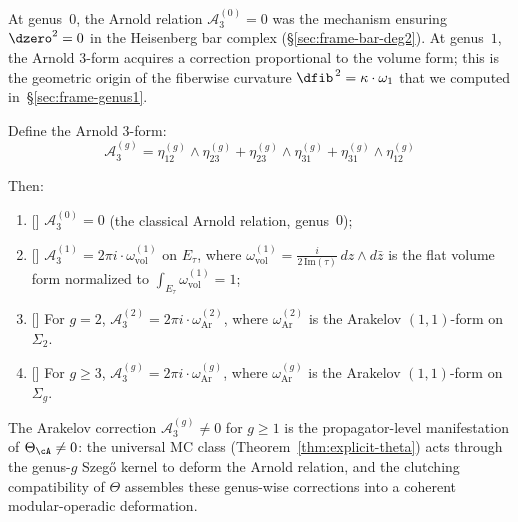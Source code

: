 \begin{theorem}
\label{thm:quantum-arnold-relations}
\label{thm:arnold-higher-genus}
\label{thm:arnold-quantum}
At genus~$0$, the Arnold relation $\mathcal{A}_3^{(0)} = 0$ was the mechanism ensuring $\dzero^2 = 0$ in the Heisenberg bar complex (\S\ref{sec:frame-bar-deg2}).  At genus~$1$, the Arnold $3$-form acquires a correction proportional to the volume form; this is the geometric origin of the fiberwise curvature $\dfib^{\,2} = \kappa \cdot \omega_1$ that we computed in~\S\ref{sec:frame-genus1}.

Define the Arnold 3-form:
\begin{equation}
\mathcal{A}_3^{(g)} = \eta_{12}^{(g)} \wedge \eta_{23}^{(g)} + \eta_{23}^{(g)} \wedge \eta_{31}^{(g)} + \eta_{31}^{(g)} \wedge \eta_{12}^{(g)}
\end{equation}

Then:
\begin{enumerate}
\item[\textup{(a)}] \textup{[\ClaimStatusProvedHere]} $\mathcal{A}_3^{(0)} = 0$ \textup{(}the classical Arnold relation, genus~$0$\textup{);}

\item[\textup{(b)}] \textup{[\ClaimStatusProvedHere]} $\mathcal{A}_3^{(1)} = 2\pi i \cdot \omega_{\mathrm{vol}}^{(1)}$ on $E_\tau$, where $\omega_{\mathrm{vol}}^{(1)} = \frac{i}{2\,\mathrm{Im}(\tau)}\, dz \wedge d\bar{z}$ is the flat volume form normalized to $\int_{E_\tau} \omega_{\mathrm{vol}}^{(1)} = 1$;

\item[\textup{(c)}] \textup{[\ClaimStatusProvedHere]} For $g = 2$, $\mathcal{A}_3^{(2)} = 2\pi i \cdot \omega_{\mathrm{Ar}}^{(2)}$, where $\omega_{\mathrm{Ar}}^{(2)}$ is the Arakelov $(1,1)$-form on $\Sigma_2$.

\item[\textup{(d)}] \textup{[\ClaimStatusProvedHere]} For $g \geq 3$, $\mathcal{A}_3^{(g)} = 2\pi i \cdot \omega_{\mathrm{Ar}}^{(g)}$, where $\omega_{\mathrm{Ar}}^{(g)}$ is the Arakelov $(1,1)$-form on $\Sigma_g$.
\end{enumerate}

The Arakelov correction $\mathcal{A}_3^{(g)} \neq 0$ for $g \geq 1$
is the propagator-level manifestation of
$\Theta_{\cA} \neq 0$: the universal MC class
(Theorem~\ref{thm:explicit-theta}) acts through the
genus-$g$ Szeg\H{o} kernel to deform the Arnold relation,
and the clutching compatibility of $\Theta$ assembles these
genus-wise corrections into a coherent modular-operadic
deformation.
\end{theorem}

